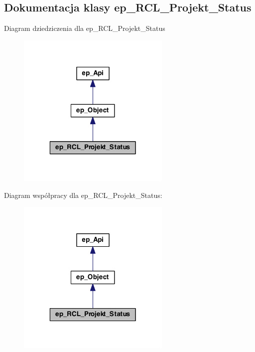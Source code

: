 \hypertarget{classep___r_c_l___projekt___status}{\subsection{Dokumentacja klasy ep\-\_\-\-R\-C\-L\-\_\-\-Projekt\-\_\-\-Status}
\label{classep___r_c_l___projekt___status}
}


Diagram dziedziczenia dla ep\-\_\-\-R\-C\-L\-\_\-\-Projekt\-\_\-\-Status\nopagebreak
\begin{figure}[H]
\begin{center}
\leavevmode
\includegraphics[width=208pt]{classep___r_c_l___projekt___status__inherit__graph}
\end{center}
\end{figure}


Diagram współpracy dla ep\-\_\-\-R\-C\-L\-\_\-\-Projekt\-\_\-\-Status\-:\nopagebreak
\begin{figure}[H]
\begin{center}
\leavevmode
\includegraphics[width=208pt]{classep___r_c_l___projekt___status__coll__graph}
\end{center}
\end{figure}
